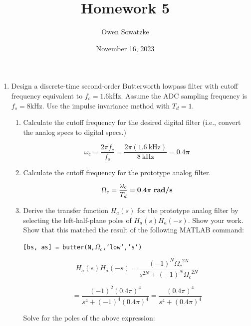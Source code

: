 \documentclass[fleqn]{article}
\title{Homework 5}
\author{Owen Sowatzke}
\date{November 16, 2023}
\newcommand{\zerodisplayskip}{
	\setlength{\abovedisplayskip}{0pt}%
	\setlength{\belowdisplayskip}{0pt}%
	\setlength{\abovedisplayshortskip}{0pt}%
	\setlength{\belowdisplayshortskip}{0pt}%
	\setlength{\mathindent}{0pt}}
\begin{document}
	\offinterlineskip
	\setlength{\lineskip}{12pt}
	\zerodisplayskip
	\maketitle
	
	\begin{enumerate}[nolistsep]
		\item Design a discrete-time second-order Butterworth lowpass filter with cutoff frequency equivalent to $f_c = 1.6 \text{kHz}$. Assume the ADC sampling frequency is $f_s = 8 \text{kHz}$. Use the impulse invariance method with $T_d = 1$.
		
			\begin{enumerate}[nolistsep]
				\item Calculate the cutoff frequency for the desired digital filter (i.e., convert the analog specs to digital specs.)
				
					\begin{equation*}
						\omega_c = \frac{2{\pi}f_c}{f_s} = \frac{2{\pi}(1.6\ \text{kHz})}{8\ \text{kHz}} = \mathbf{0.4\pi}
					\end{equation*}
					
				\item Calculate the cutoff frequency for the prototype analog filter.
				
					\begin{equation*}
						\Omega_c = \frac{\omega_c}{T_d} = \mathbf{0.4\pi\ \text{\textbf{rad/s}}} 
					\end{equation*}
					
				\item Derive the transfer function $H_a(s)$ for the prototype analog filter by selecting the left-half-plane poles of $H_a(s)H_a(-s)$. Show your work. Show that this matched the result of the following MATLAB command:
				
				\texttt{[bs, as] = butter(N,$\Omega_c$,'low','s')}
				
				\begin{equation*}
					H_a(s)H_a(-s) = \frac{(-1)^N{\Omega_c}^{2N}}{s^{2N} + (-1)^N{\Omega_c}^{2N}}
				\end{equation*}
				
				\begin{equation*}
					= \frac{(-1)^2(0.4\pi)^4}{s^4 + (-1)^4(0.4\pi)^4} = \frac{(0.4\pi)^4}{s^4 + (0.4\pi)^4}
				\end{equation*}
				
				Solve for the poles of the above expression:
				

\end{enumerate}
\end{enumerate}
\end{document}
